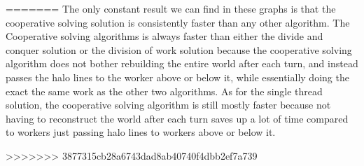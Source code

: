 \documentclass[10pt,a4paper,dvipsnames,cmyk]{scrartcl}
\begin{document}
=======
The only constant result we can find in these graphs is that the cooperative
solving solution is consistently faster than any other algorithm. The
Cooperative solving algorithms is always faster than either the divide and
conquer solution or the division of work solution because the cooperative
solving algorithm does not bother rebuilding the entire world after each
turn, and instead passes the halo lines to the worker above or below it,
while essentially doing the exact the same work as the other two algorithms.
As for the single thread solution, the cooperative solving algorithm is
still mostly faster because not having to reconstruct the world after each
turn saves up a lot of time compared to workers just passing halo lines to
workers above or below it.

>>>>>>> 3877315cb28a6743dad8ab40740f4dbb2ef7a739
\end{document}
